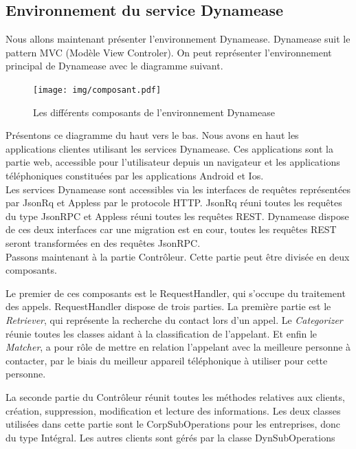 \subsection{Environnement du service Dynamease}

Nous allons maintenant présenter l'environnement Dynamease. Dynamease suit le pattern MVC (Modèle View Controler). On peut représenter l'environnement principal de Dynamease avec le diagramme suivant.

\newpage

\begin{figure}[!h]
	\centering
	\texttt{[image: img/composant.pdf]}
	\caption{\label{composant} Les différents composants de l'environnement Dynamease}
\end{figure}

Présentons ce diagramme du haut vers le bas. Nous avons en haut les applications clientes utilisant les services Dynamease. Ces applications sont la partie web, accessible pour l'utilisateur depuis un navigateur et les applications téléphoniques constituées par les applications Android et Ios.\\

Les services Dynamease sont accessibles via les interfaces de requêtes représentées par JsonRq et Appless par le protocole HTTP. JsonRq réuni toutes les requêtes du type JsonRPC et Appless réuni toutes les requêtes REST. Dynamease dispose de ces deux interfaces car une migration est en cour, toutes les requêtes REST seront transformées en des requêtes JsonRPC.\\

Passons maintenant à la partie Contrôleur. Cette partie peut être divisée en deux composants.

Le premier de ces composants est le RequestHandler, qui s'occupe du traitement des appels. RequestHandler dispose de trois parties. La première partie est le \textit{Retriever}, qui représente la recherche du contact lors d'un appel. Le \textit{Categorizer} réunie toutes les classes aidant à la classification de l'appelant. Et enfin le \textit{Matcher}, a pour rôle de mettre en relation l'appelant avec la meilleure personne à contacter, par le biais du meilleur appareil téléphonique à utiliser pour cette personne.

La seconde partie du Contrôleur réunit toutes les méthodes relatives aux clients, création, suppression, modification et lecture des informations. Les deux classes utilisées dans cette partie sont le CorpSubOperations pour les entreprises, donc du type Intégral. Les autres clients sont gérés par la classe DynSubOperations\\

